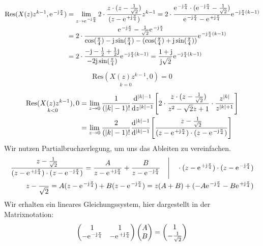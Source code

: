 \documentclass[11pt,a4paper,DIV=12]{scrartcl}
\begin{document}
\begin{align}
	\mathrm{Res}(X(z)z^{k-1},\e^{-\im\frac{\pi}{4}})&=\lim\limits_{z\rightarrow\e^{-\im\frac{\pi}{4}}}2\cdot\frac{z\cdot(z-\frac{1}{\sqrt{2}})}{(z-\e^{+\im\frac{\pi}{4}})}z^{k-1}=2\cdot\frac{\e^{-\im\frac{\pi}{4}}\cdot(\e^{-\im\frac{\pi}{4}}-\frac{1}{\sqrt{2}})}{\e^{-\im\frac{\pi}{4}}-\e^{+\im\frac{\pi}{4}}}\e^{-\im\frac{\pi}{4}(k-1)} \nonumber \\
	&=2\cdot\frac{\e^{-\im\frac{\pi}{2}}-\frac{1}{\sqrt{2}}\e^{-\im\frac{\pi}{4}}}{\cos(\frac{\pi}{4})-\im\sin(\frac{\pi}{4})-(\cos(\frac{\pi}{4})+\im\sin(\frac{\pi}{4}))}\e^{-\im\frac{\pi}{4}(k-1)}\nonumber\\
	&=2\cdot\frac{-\im-\frac{1}{2}+\frac{1}{2}\im}{-2\im\sin(\frac{\pi}{4})}\e^{-\im\frac{\pi}{4}(k-1)}=\frac{1+\im}{\im\sqrt{2}}\e^{-\im\frac{\pi}{4}(k-1)}
\end{align}
\begin{align}
	\underset{k=0}{\mathrm{Res}(X(z)z^{k-1},0)}=0
\end{align}
\begin{align}
	\underset{k<0}{\mathrm{Res}(X(z)z^{k-1}),0}&=\lim\limits_{z\rightarrow0}\frac{1}{(|k|-1)!}\frac{\mathrm{d}^{|k|-1}}{\mathrm{d}z^{|k|-1}}\Bigg [2\cdot\frac{z\cdot(z-\frac{1}{\sqrt{2}})}{z^2-\sqrt{2}z+1}\cdot\frac{z^{|k|}}{z^{|k|+1}}\Bigg]\nonumber\\
	&=\lim\limits_{z\rightarrow0}\frac{2}{(|k|-1)!}\frac{\mathrm{d}^{|k|-1}}{\mathrm{d}^{|k|-1}}\Bigg [\frac{z-\frac{1}{\sqrt{2}}}{(z-\e^{+\im\frac{\pi}{4}})\cdot(z-\e^{-\im\frac{\pi}{4}})}\Bigg]
\end{align}
Wir nutzen Partialbruchzerlegung, um uns das Ableiten zu vereinfachen.
\begin{align}
	\frac{z-\frac{1}{\sqrt{2}}}{(z-\e^{+\im\frac{\pi}{4}})\cdot(z-\e^{-\im\frac{\pi}{4}})}=\frac{A}{z-\e^{+\im\frac{\pi}{4}}}+\frac{B}{z-\e^{-\im\frac{\pi}{4}}}\quad\Bigg | \quad \cdot(z-\e^{+\im\frac{\pi}{4}})\cdot(z-\e^{-\im\frac{\pi}{4}}) \nonumber\\
	z-\frac{}{\sqrt{2}}=A(z-\e^{-\im\frac{\pi}{4}})+B(z-\e^{-\im\frac{\pi}{4}})=z(A+B)+(-A\e^{-\im\frac{\pi}{4}}-B\e^{+\im\frac{\pi}{4}})
\end{align}
Wir erhalten ein lineares Gleichungssystem, hier dargestellt in der Matrixnotation:
\begin{align}
	\begin{pmatrix}
		1 & 1 \\
		-\e^{-\im\frac{\pi}{4}} & -\e^{+\im\frac{\pi}{4}}
	\end{pmatrix}
	\begin{pmatrix}
		A \\
		B
	\end{pmatrix}
	=
	\begin{pmatrix}
		1 \\
		-\frac{1}{\sqrt{2}}
	\end{pmatrix}
\end{align}
\end{document}
